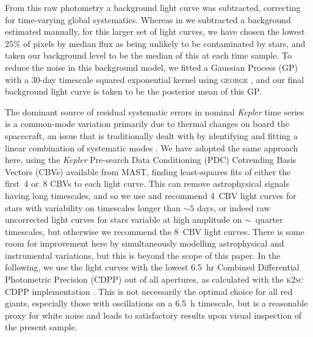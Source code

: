 \documentclass[a4paper,fleqn,usenatbib]{mnras}
\newcommand{\kepler}{\textit{Kepler}\xspace}
\begin{document}
From this raw photometry a background light curve was subtracted, correcting for time-varying global systematics. Whereas in \citet{smear} we subtracted a background estimated manually, for this larger set of light curves, we have chosen the lowest $25\%$ of pixels by median flux as being unlikely to be contaminated by stars, and taken our background level to be the median of this at each time sample. To reduce the noise in this background model, we fitted a Gaussian Process (GP) with a 30-day timescale squared exponential kernel using \textsc{george} \citep{hodlr}, and our final background light curve is taken to be the posterior mean of this GP. 

The dominant source of residual systematic errors in nominal \kepler time series is a common-mode variation primarily due to thermal changes on board the spacecraft, an issue that is traditionally dealt with by identifying and fitting a linear combination of systematic modes \citep{pdc0,pdc1,pdc2,petigura}. We have adopted the same approach here, using the \kepler Pre-search Data Conditioning (PDC) Cotrending Basis Vectors (CBVs) available from MAST, finding least-squares fits of either the first~4 or~8 CBVs to each light curve. This can remove astrophysical signals having long timescales, and so we use and recommend 4~CBV light curves for stars with variability on timescales longer than $\sim 5$ days, or indeed raw uncorrected light curves for stars variable at high amplitude on $\sim$~quarter timescales, but otherwise we recommend the 8~CBV light curves. There is some room for improvement here by simultaneously modelling astrophysical and instrumental variations, but this is beyond the scope of this paper. In the following, we use the light curves with the lowest 6.5~hr Combined Differential Photometric Precision (CDPP) \citep{cdpp} out of all apertures, as calculated with the \textsc{k2sc} CDPP implementation \citep{k2sc}. This is not necessarily the optimal choice for all red giants, especially those with oscillations on a 6.5~h timescale, but is a reasonable proxy for white noise and leads to satisfactory results upon visual inspection of the present sample.
\end{document}
